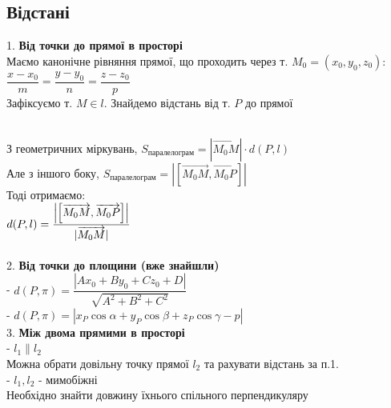 \documentclass[a4paper, 14pt]{extarticle}
\def\bigline{\vspace{5mm}\\}
\begin{document}
\subsection{Відстані}
1. \textbf{Від точки до прямої в просторі}\\
Маємо канонічне рівняння прямої, що проходить через т. $M_0 = (x_0,y_0,z_0)$:\\
$\dfrac{x-x_0}{m} = \dfrac{y-y_0}{n} = \dfrac{z-z_0}{p}$\\
Зафіксуємо т. $M \in l$. Знайдемо відстань від т. $P$ до прямої\\
\\
З геометричних міркувань, $S_{\textrm{паралелограм}} = |\overrightarrow{M_0M}| \cdot d(P,l)$\\
Але з іншого боку, $S_{\textrm{паралелограм}} = |[\overrightarrow{M_0M},\overrightarrow{M_0P}]|$\\
Тоді отримаємо:\\
$d(P,l)= \dfrac{\abs{\left[\overrightarrow{M_0M},\overrightarrow{M_0P} \right]}}{|\overrightarrow{M_0 M}|}$\\
\bigline
2. \textbf{Від точки до площини (вже знайшли)}\\
- $d(P,\pi) = \dfrac{|Ax_0+By_0+Cz_0+D|}{\sqrt{A^2+B^2+C^2}}$\\
- $d(P,\pi) = |x_P \cos \alpha + y_P \cos \beta +z_P \cos \gamma - p|$
\bigline
3. \textbf{Між двома прямими в просторі}\\
- $l_1 \parallel l_2$\\
Можна обрати довільну точку прямої $l_2$ та рахувати відстань за п.1.
\bigline
- $l_1, l_2$ - мимобіжні\\
Необхідно знайти довжину їхнього спільного перпендикуляру\\
\def\size{3}
\end{document}
